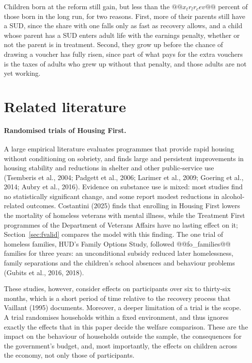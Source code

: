 \documentclass[10pt]{article}
\begin{document}
Children born at the reform still gain, but less than the $@@x_tr_lr_cev@@$ percent of those born in the long run, for two reasons. First, more of their parents still have a SUD, since the share with one falls only as fast as recovery allows, and a child whose parent has a SUD enters adult life with the earnings penalty, whether or not the parent is in treatment. Second, they grow up before the chance of drawing a voucher has fully risen, since part of what pays for the extra vouchers is the taxes of adults who grew up without that penalty, and those adults are not yet working. 


\section{Related literature}\label{sec:literature}

\paragraph{Randomised trials of Housing First.} A large empirical literature
evaluates programmes that provide rapid housing without conditioning on sobriety,
and finds large and persistent improvements in housing stability and reductions in
shelter and other public-service use (Tsemberis et al., 2004; Padgett et al., 2006; Larimer et al., 2009; Goering et al., 2014; Aubry et
al., 2016). Evidence on substance use is mixed: most studies find no statistically
significant change, and some report modest reductions in alcohol-related outcomes. Costantini (2025) finds that enrolling in Housing First lowers the mortality of homeless veterans with mental illness, while the Treatment First programmes of the Department of Veterans Affairs have no lasting effect on it; Section~\ref{sec:fvalid} compares the model with this finding. The one trial of homeless families, HUD's Family Options Study, followed @@fo_families@@ families for three years: an unconditional subsidy reduced later homelessness, family separations and the children's school absences and behaviour problems (Gubits et al., 2016, 2018).

 These studies, however, consider effects on participants over six to thirty-six months, which is a short period of time relative to the recovery process that Vaillant (1995) documents.  Moreover, a deeper limitation of a trial is the scope. A trial randomises households within a fixed environment, and thus ignores exactly the effects that in this paper decide the welfare comparison. These are the impact on the behaviour of households outside the sample, the consequences for the government's budget, and, most importantly, the effects on children across the economy, not only those of participants.
\end{document}
